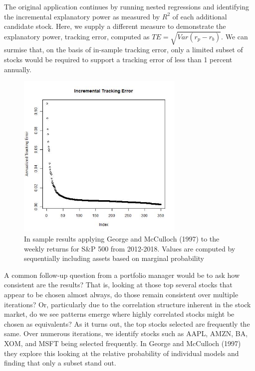 \documentclass[a4paper, 12pt]{article}
\theoremstyle{plain}
\theoremstyle{definition}
\theoremstyle{remark}
\begin{document}
The original application continues by running nested regressions and identifying the incremental explanatory power as measured by $R^2$ of each additional candidate stock. Here, we supply a different measure to demonstrate the explanatory power, tracking error, computed as $TE=\sqrt{Var(r_p-r_b)}$. We can surmise that, on the basis of in-sample tracking error, only a limited subset of stocks would be required to support a tracking error of less than 1 percent annually.

\begin{figure}[H]
\centering
\includegraphics[width=8cm]{te-plot}
\caption{In sample results applying George and McCulloch (1997) to the weekly returns for S\&P 500 from 2012-2018. Values are computed by sequentially including assets based on marginal probability }
\end{figure}

A common follow-up question from a portfolio manager would be to ask how consistent are the results? That is, looking at those top several stocks that appear to be chosen almost always, do those remain consistent over multiple iterations? Or, particularly due to the correlation structure inherent in the stock market, do we see patterns emerge where highly correlated stocks might be chosen as equivalents? As it turns out, the top stocks selected are frequently the same. Over numerous iterations, we identify stocks such as AAPL, AMZN, BA, XOM, and MSFT being selected frequently. In George and McCulloch (1997) they explore this looking at the relative probability of individual models and finding that only a subset stand out.
\end{document}
